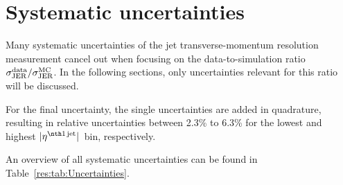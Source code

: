 \chapter{Systematic uncertainties}

Many systematic uncertainties of the jet transverse-momentum resolution measurement cancel out when focusing on the data-to-simulation ratio $\sigma_\mathrm{JER}^{\text{data}}/\sigma_\mathrm{JER}^{\text{MC}}$.
In the following sections, only uncertainties relevant for this ratio will be discussed.

For the final uncertainty, the single uncertainties are added in quadrature, resulting in relative uncertainties between 2.3\% to 6.3\% for the lowest and highest $|\etafirstjet|$~bin, respectively. 

An overview of all systematic uncertainties can be found in Table~\ref{res:tab:Uncertainties}.

